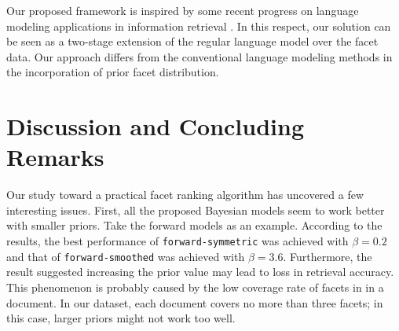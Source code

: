 Our proposed framework is inspired by some recent progress on language modeling
applications in information retrieval
\cite{lavrenko2001relevance,zaragorza2003bayesian}.  In this respect, our
solution can be seen as a two-stage extension of the regular language model
over the facet data.  Our approach differs from the conventional language
modeling methods in the incorporation of prior facet distribution.

\section{Discussion and Concluding Remarks}\label{s:concluding-remarks}


Our study toward a practical facet ranking algorithm has uncovered a few
interesting issues.  First, all the proposed Bayesian models seem to work
better with smaller priors.  Take the forward models as an example.  According
to the results, the best performance of {\tt forward-symmetric} was achieved
with $\beta = 0.2$ and that of {\tt forward-smoothed} was achieved with $\beta
= 3.6$.  Furthermore, the result suggested increasing the prior value may lead
to loss in retrieval accuracy.  This phenomenon is probably caused by the low
coverage rate of facets in in a document.  In our dataset, each document covers
no more than three facets; in this case, larger priors might not work too well.  

